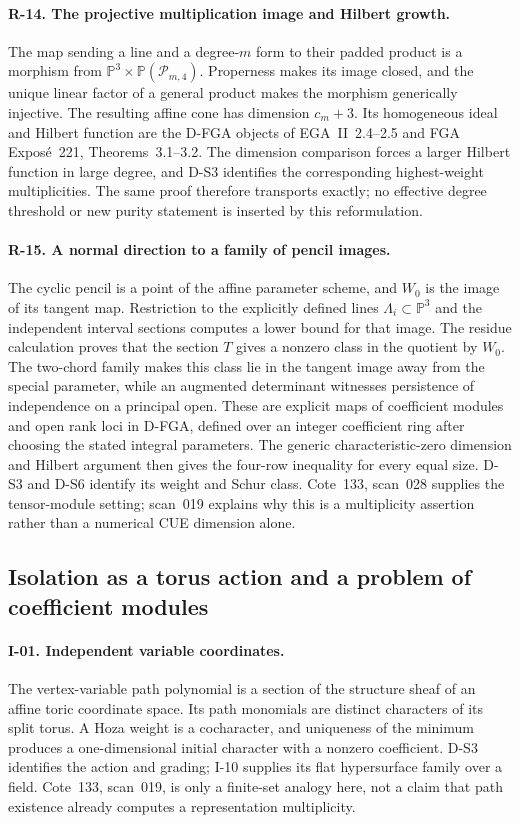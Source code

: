 \paragraph{R-14. The projective multiplication image and Hilbert growth.}
The map sending a line and a degree-$m$ form to their padded product is a morphism from $\mathbb P^3\times\mathbb P(\mathcal P_{m,4})$. Properness makes its image closed, and the unique linear factor of a general product makes the morphism generically injective. The resulting affine cone has dimension $c_m+3$. Its homogeneous ideal and Hilbert function are the D-FGA objects of EGA~II~2.4--2.5 and FGA Expos\'e~221, Theorems~3.1--3.2. The dimension comparison forces a larger Hilbert function in large degree, and D-S3 identifies the corresponding highest-weight multiplicities. The same proof therefore transports exactly; no effective degree threshold or new purity statement is inserted by this reformulation.

\paragraph{R-15. A normal direction to a family of pencil images.}
The cyclic pencil is a point of the affine parameter scheme, and $W_0$ is the image of its tangent map. Restriction to the explicitly defined lines $\Lambda_i\subset\mathbb P^3$ and the independent interval sections computes a lower bound for that image. The residue calculation proves that the section $T$ gives a nonzero class in the quotient by $W_0$. The two-chord family makes this class lie in the tangent image away from the special parameter, while an augmented determinant witnesses persistence of independence on a principal open. These are explicit maps of coefficient modules and open rank loci in D-FGA, defined over an integer coefficient ring after choosing the stated integral parameters. The generic characteristic-zero dimension and Hilbert argument then gives the four-row inequality for every equal size. D-S3 and D-S6 identify its weight and Schur class. Cote~133, scan~028 supplies the tensor-module setting; scan~019 explains why this is a multiplicity assertion rather than a numerical CUE dimension alone.

\subsection{Isolation as a torus action and a problem of coefficient modules}

\paragraph{I-01. Independent variable coordinates.}
The vertex-variable path polynomial is a section of the structure sheaf of an affine toric coordinate space. Its path monomials are distinct characters of its split torus. A Hoza weight is a cocharacter, and uniqueness of the minimum produces a one-dimensional initial character with a nonzero coefficient. D-S3 identifies the action and grading; I-10 supplies its flat hypersurface family over a field. Cote~133, scan~019, is only a finite-set analogy here, not a claim that path existence already computes a representation multiplicity.

